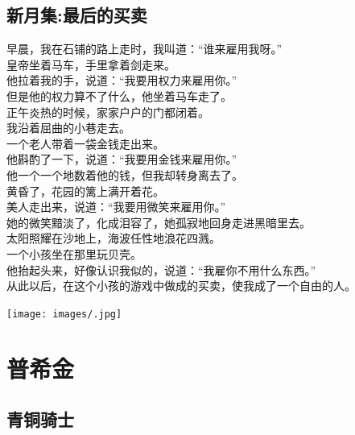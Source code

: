 \documentclass[
]{book}
\renewenvironment{quote}{\begin{VF}}{\end{VF}}
\begin{document}
\hypertarget{section-50}{%
\section{新月集:最后的买卖}\label{section-50}}

\begin{quote}
早晨，我在石铺的路上走时，我叫道：``谁来雇用我呀。''\\
皇帝坐着马车，手里拿着剑走来。\\
他拉着我的手，说道：``我要用权力来雇用你。''\\
但是他的权力算不了什么，他坐着马车走了。\\
正午炎热的时候，家家户户的门都闭着。\\
我沿着屈曲的小巷走去。\\
一个老人带着一袋金钱走出来。\\
他斟酌了一下，说道：``我要用金钱来雇用你。''\\
他一个一个地数着他的钱，但我却转身离去了。\\
黄昏了，花园的篱上满开着花。\\
美人走出来，说道：``我要用微笑来雇用你。''\\
她的微笑黯淡了，化成泪容了，她孤寂地回身走进黑暗里去。\\
太阳照耀在沙地上，海波任性地浪花四溅。\\
一个小孩坐在那里玩贝壳。\\
他抬起头来，好像认识我似的，说道：``我雇你不用什么东西。''\\
从此以后，在这个小孩的游戏中做成的买卖，使我成了一个自由的人。
\end{quote}

\texttt{[image: images/.jpg]}

\hypertarget{section-51}{%
\chapter{普希金}\label{section-51}}

\hypertarget{section-52}{%
\section{青铜骑士}\label{section-52}}
\end{document}
